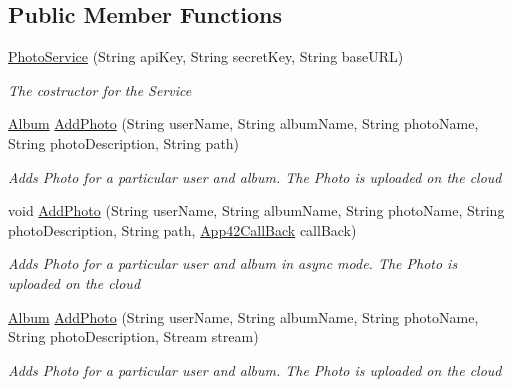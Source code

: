 \subsection*{Public Member Functions}
\begin{DoxyCompactItemize}
\item 
\hyperlink{classcom_1_1shephertz_1_1app42_1_1paas_1_1sdk_1_1csharp_1_1gallery_1_1_photo_service_acf3ea97e87c6dbe71bbb1b5344435878}{Photo\+Service} (String api\+Key, String secret\+Key, String base\+U\+R\+L)
\begin{DoxyCompactList}\small\item\em The costructor for the Service \end{DoxyCompactList}\item 
\hyperlink{classcom_1_1shephertz_1_1app42_1_1paas_1_1sdk_1_1csharp_1_1gallery_1_1_album}{Album} \hyperlink{classcom_1_1shephertz_1_1app42_1_1paas_1_1sdk_1_1csharp_1_1gallery_1_1_photo_service_a562d6a54226166722ccd6c15c1cde9ed}{Add\+Photo} (String user\+Name, String album\+Name, String photo\+Name, String photo\+Description, String path)
\begin{DoxyCompactList}\small\item\em Adds Photo for a particular user and album. The Photo is uploaded on the cloud \end{DoxyCompactList}\item 
void \hyperlink{classcom_1_1shephertz_1_1app42_1_1paas_1_1sdk_1_1csharp_1_1gallery_1_1_photo_service_a54d2edab97e535409e8d06b2090689bc}{Add\+Photo} (String user\+Name, String album\+Name, String photo\+Name, String photo\+Description, String path, \hyperlink{interfacecom_1_1shephertz_1_1app42_1_1paas_1_1sdk_1_1csharp_1_1_app42_call_back}{App42\+Call\+Back} call\+Back)
\begin{DoxyCompactList}\small\item\em Adds Photo for a particular user and album in async mode. The Photo is uploaded on the cloud \end{DoxyCompactList}\item 
\hyperlink{classcom_1_1shephertz_1_1app42_1_1paas_1_1sdk_1_1csharp_1_1gallery_1_1_album}{Album} \hyperlink{classcom_1_1shephertz_1_1app42_1_1paas_1_1sdk_1_1csharp_1_1gallery_1_1_photo_service_afbcdfc2433c59bac1cfe19ad0a20587c}{Add\+Photo} (String user\+Name, String album\+Name, String photo\+Name, String photo\+Description, Stream stream)
\begin{DoxyCompactList}\small\item\em Adds Photo for a particular user and album. The Photo is uploaded on the cloud \end{DoxyCompactList}\item 

\end{DoxyCompactItemize}
